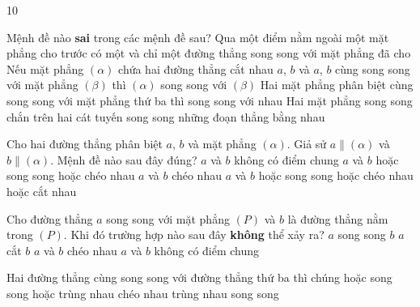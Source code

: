 \begin{indapan}{10}
	\begin{ex}%
		Mệnh đề nào \textbf{sai} trong các mệnh đề sau?
		\choice
		{\True Qua một điểm nằm ngoài một mặt phẳng cho trước có một và chỉ một đường thẳng song song với mặt phẳng đã cho}
		{Nếu mặt phẳng $(\alpha)$ chứa hai đường thẳng cắt nhau $a$, $b$ và $a$, $b$ cùng song song với mặt phẳng $(\beta)$ thì $(\alpha)$ song song với $(\beta)$}
		{Hai mặt phẳng phân biệt cùng song song với mặt phẳng thứ ba thì song song với nhau}
		{Hai mặt phẳng song song chắn trên hai cát tuyến song song những đoạn thẳng bằng nhau}
	\end{ex}

	\begin{ex}%
		Cho hai đường thẳng phân biệt $a$, $b$ và mặt phẳng $(\alpha)$. Giả sử $a \parallel (\alpha)$ và $b \parallel (\alpha)$. Mệnh đề nào sau đây đúng?
		\choice
		{$a$ và $b$ không có điểm chung}
		{$a$ và $b$ hoặc song song hoặc chéo nhau}
		{$a$ và $b$ chéo nhau}
		{\True $a$ và $b$ hoặc song song hoặc chéo nhau hoặc cắt nhau}
	\end{ex}

	\begin{ex}%
		Cho đường thẳng $a$ song song với mặt phẳng $(P)$ và $b$ là đường thẳng nằm trong $(P)$. Khi đó trường hợp nào sau đây \textbf{không} thể xảy ra?
		\choice
		{$a$ song song $b$}
		{\True $a$ cắt $b$}
		{$a$ và $b$ chéo nhau}
		{$a$ và $b$ không có điểm chung}
	\end{ex}

	\begin{ex}%
		Hai đường thẳng cùng song song với đường thẳng thứ ba thì chúng
		\choice
		{\True hoặc song song hoặc trùng nhau}
		{chéo nhau}
		{trùng nhau}
		{song song}
	\end{ex}


\end{indapan}
